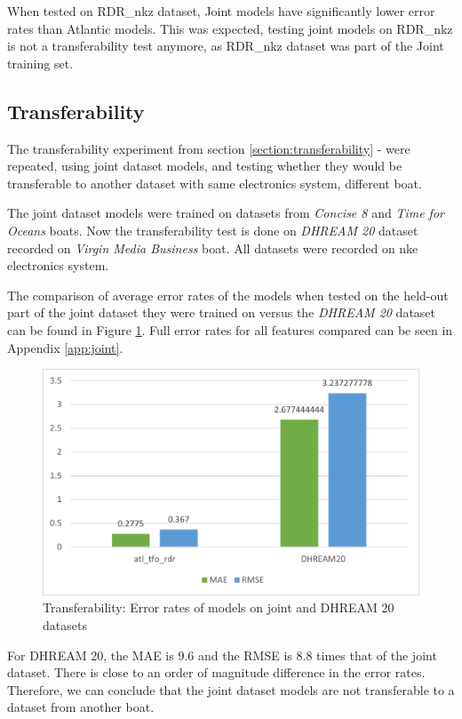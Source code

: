 \documentclass[12pt,twoside]{report}
\begin{document}
When tested on RDR\_nkz dataset, Joint models have significantly lower error rates than Atlantic models. This was expected, testing joint models on RDR\_nkz is not a transferability test anymore, as RDR\_nkz dataset was part of the Joint training set.

\subsection{Transferability}
The transferability experiment from section \ref{section:transferability} -  were repeated, using joint dataset models, and testing whether they would be transferable to another dataset with same electronics system, different boat.

The joint dataset models were trained on datasets from \textit{Concise 8} and \textit{Time for Oceans} boats. Now the transferability test is done on  \textit{DHREAM 20} dataset recorded on \textit{Virgin Media Business} boat. All datasets were recorded on nke electronics system.

The comparison of average error rates of the models when tested on the held-out part of the joint dataset they were trained on versus the \textit{DHREAM 20} dataset can be found in Figure \ref{fig:joint-transferability}. Full error rates for all features compared can be seen in Appendix \ref{app:joint}. 

\begin{figure}[htbp]
\centering
\includegraphics[width = 0.7\hsize]{figures/joint-models/joint-transferability.png}
\caption{Transferability: Error rates of models on joint and DHREAM 20 datasets}
\label{fig:joint-transferability}
\end{figure}

For DHREAM 20, the MAE is 9.6 and the RMSE is 8.8 times that of the joint dataset. There is close to an order of magnitude difference in the error rates. Therefore, we can conclude that the joint dataset models are not transferable to a dataset from another boat.
\end{document}
